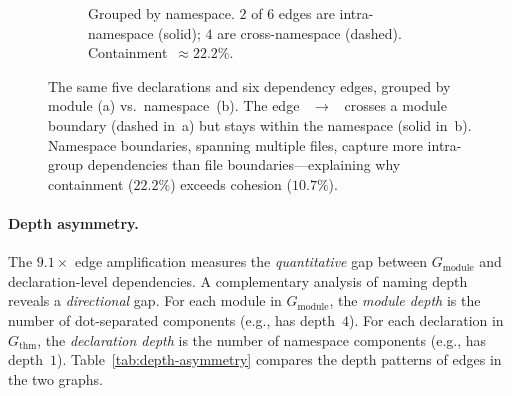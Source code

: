 \begin{figure}[ht]
\begin{subfigure}[b]{0.48\textwidth}
\caption{Grouped by \textcolor{green!50!black}{namespace}. $2$ of $6$ edges are intra-namespace (solid); $4$ are cross-namespace (dashed). Containment~$\approx 22.2\%$.}
\label{fig:ns-vs-mod-namespace}
\end{subfigure}
\caption{The same five declarations and six dependency edges, grouped by module (a) vs.\ namespace~(b). The edge ~$\to$~ crosses a \textcolor{blue!60!black}{module boundary} (dashed in~a) but stays within the \textcolor{green!50!black}{} namespace (solid in~b). Namespace boundaries, spanning multiple files, capture more intra-group dependencies than file boundaries---explaining why containment ($22.2\%$) exceeds cohesion ($10.7\%$).}
\label{fig:ns-vs-mod}
\end{figure}

\paragraph{Depth asymmetry.}
\label{sec:depth-asymmetry}

\noindent The $9.1\times$ edge amplification measures the \emph{quantitative} gap between $G_{\mathrm{module}}$ and declaration-level dependencies. A complementary analysis of naming depth reveals a \emph{directional} gap. For each module in $G_{\mathrm{module}}$, the \emph{module depth} is the number of dot-separated components (e.g.,  has depth~$4$). For each declaration in $G_{\mathrm{thm}}$, the \emph{declaration depth} is the number of namespace components (e.g.,  has depth~$1$). Table~\ref{tab:depth-asymmetry} compares the depth patterns of edges in the two graphs.

